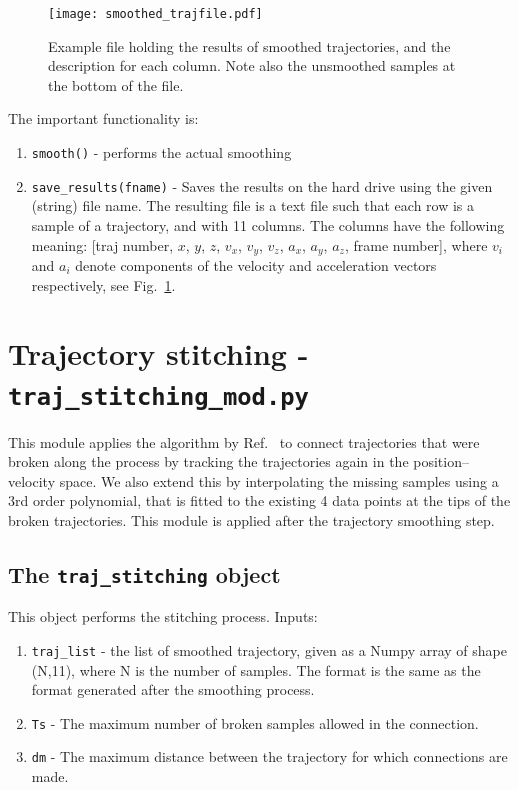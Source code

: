 \documentclass[10pt,a4paper]{article}
\begin{document}
\begin{figure}[!ht]
	\centering
	\texttt{[image: smoothed\_trajfile.pdf]}
	\caption{Example file holding the results of smoothed trajectories, and the description for each column. Note also the unsmoothed samples at the bottom of the file. \label{fig:smoothedfile}}
\end{figure}

The important functionality is:

\begin{enumerate}
	\item \texttt{smooth()} - performs the actual smoothing
	\item \texttt{save\_results(fname)} - Saves the results on the hard drive using the given (string) file name. The resulting file is a text file such that each row is a sample of a trajectory, and with 11 columns. The columns have the following meaning:
	[traj number, $x$, $y$, $z$, $v_x$, $v_y$, $v_z$, $a_x$, $a_y$, $a_z$, frame number], where $v_i$ and $a_i$ denote components of the velocity and acceleration vectors respectively, see Fig.~\ref{fig:smoothedfile}.
\end{enumerate}







\section{Trajectory stitching - \texttt{traj\_stitching\_mod.py}}\label{sec:stitching}

This module applies the algorithm by Ref.~\cite{Xu2008} to connect trajectories that were broken along the process by tracking the trajectories again in the position--velocity space. We also extend this by interpolating the missing samples using a 3rd order polynomial, that is fitted to the existing 4 data points at the tips of the broken trajectories. This module is applied after the trajectory smoothing step.




\subsection{The \texttt{traj\_stitching} object}

This object performs the stitching process. Inputs:

\begin{enumerate}
	\item \texttt{traj\_list} - the list of smoothed trajectory, given as a Numpy array of shape (N,11), where N is the number of samples. The format is the same as the format generated after the smoothing process.
	\item \texttt{Ts} - The maximum number of broken samples allowed in the connection.
	\item \texttt{dm} - The maximum distance between the trajectory for which connections are made.
\end{enumerate}
\end{document}
